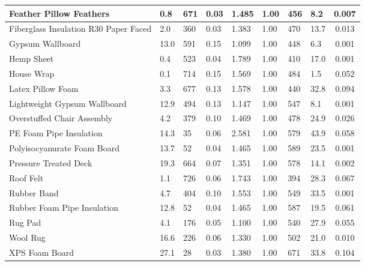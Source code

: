 \begin{table}[!h]
\begin{tabular}{|p{4.5cm}|p{1.0cm}|p{1.0cm}|p{1.0cm}|p{1.4cm}|p{0.8cm}|p{1.0cm}|p{1.0cm}|c|}
$$Feather Pillow Feathers                           & 0.8 & 671 & 0.03 & 1.485 & 1.00 & 456 & 8.2 & 0.007 \\\hline
Fiberglass Insulation R30 Paper Faced             & 2.0 & 360 & 0.03 & 1.383 & 1.00 & 470 & 13.7 & 0.013 \\\hline
Gypsum Wallboard                                  & 13.0 & 591 & 0.15 & 1.099 & 1.00 & 448 & 6.3 & 0.001 \\\hline
Hemp Sheet                                        & 0.4 & 523 & 0.04 & 1.789 & 1.00 & 410 & 17.0 & 0.001 \\\hline
House Wrap                                        & 0.1 & 714 & 0.15 & 1.569 & 1.00 & 484 & 1.5 & 0.052 \\\hline
Latex Pillow Foam                                 & 3.3 & 677 & 0.13 & 1.578 & 1.00 & 440 & 32.8 & 0.094 \\\hline
Lightweight Gypsum Wallboard                      & 12.9 & 494 & 0.13 & 1.147 & 1.00 & 547 & 8.1 & 0.001 \\\hline
Overstuffed Chair Assembly                        & 4.2 & 379 & 0.10 & 1.469 & 1.00 & 478 & 24.9 & 0.026 \\\hline
PE Foam Pipe Insulation                           & 14.3 & 35 & 0.06 & 2.581 & 1.00 & 579 & 43.9 & 0.058 \\\hline
Polyisocyanurate Foam Board                       & 13.7 & 52 & 0.04 & 1.465 & 1.00 & 589 & 23.5 & 0.001 \\\hline
Pressure Treated Deck                             & 19.3 & 664 & 0.07 & 1.351 & 1.00 & 578 & 14.1 & 0.002 \\\hline
Roof Felt                                         & 1.1 & 726 & 0.06 & 1.743 & 1.00 & 394 & 28.3 & 0.067 \\\hline
Rubber Band                                       & 4.7 & 404 & 0.10 & 1.553 & 1.00 & 549 & 33.5 & 0.001 \\\hline
Rubber Foam Pipe Insulation                       & 12.8 & 52 & 0.04 & 1.465 & 1.00 & 587 & 19.5 & 0.061 \\\hline
Rug Pad                                           & 4.1 & 176 & 0.05 & 1.100 & 1.00 & 540 & 27.9 & 0.055 \\\hline
Wool Rug                                          & 16.6 & 226 & 0.06 & 1.330 & 1.00 & 502 & 21.0 & 0.010 \\\hline
XPS Foam Board                                    & 27.1 & 28 & 0.03 & 1.380 & 1.00 & 671 & 33.8 & 0.104 \\\hline
\end{tabular}
\label{Properties_FSRI_Materials_Others}
\end{table}



